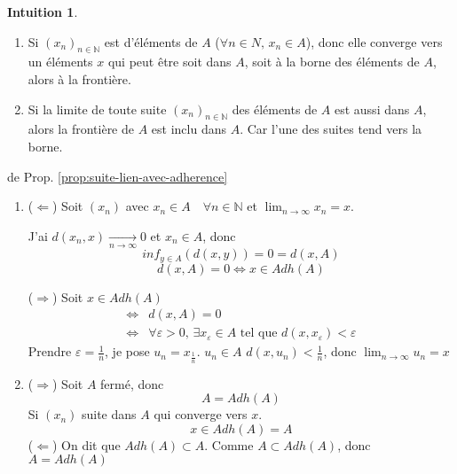 \documentclass[a4paper]{report}
\newcommand\N{\ensuremath{\mathbb{N}}}
\let\implies\Rightarrow
\let\impliedby\Leftarrow
\let\iff\Leftrightarrow
\let\epsilon\varepsilon
\theoremstyle{definition}
\newtheorem*{intuition}{Intuition}
\begin{document}
\begin{intuition}
   \begin{enumerate}
       \item Si $(x_n)_{n \in \N}$ est d'éléments de  $A$ ($\forall n \in N, \, x_n \in A$), donc elle converge vers un éléments $x$ qui peut être soit dans  $A$, soit à la borne des éléments de  $A$, alors à la frontière. 
       \item Si la limite de toute suite $(x_n)_{n \in \N}$ des éléments de  $A$ est aussi dans  $A$, alors la frontière de  $A$ est inclu dans  $A$. Car l'une des suites tend vers la borne.
   \end{enumerate} 
\end{intuition}
\begin{preuve} de Prop. \ref{prop:suite-lien-avec-adherence}
    \begin{enumerate}
        \item ($\impliedby$) Soit $(x_n)$ avec  $x_n \in A \quad \forall n \in \N$ et $\lim_{n \to \infty} x_n = x$.
            \par
            J'ai $d(x_n, x) \xrightarrow[n \to \infty]{} 0$ et $x_n \in A$, donc
             \[
                 inf_{y \in A}(d(x, y)) = 0 = d(x, A)
            \] 
            \[
            d(x, A) = 0 \iff x \in Adh(A)
            \] 
            \par
            ($\implies$) Soit $x \in Adh(A)$
             \begin{align*}
                 \iff& d(x, A) = 0\\
                \iff& \forall \epsilon > 0, \, \exists x_{\epsilon} \in A \text{ tel que } d(x, x_{\epsilon}) < \epsilon
            \end{align*}
            Prendre $\epsilon = \frac{1}{n}$, je pose $u_n = x_{\frac{1}{n}}$. $u_n \in A$  $d(x, u_n) < \frac{1}{n}$, donc $\lim_{n \to \infty} u_n = x$ 
        \item ($\implies$) Soit $A$ fermé, donc 
             \[
            A = Adh(A)
            \] 
            Si $(x_n)$ suite dans  $A$ qui converge vers  $x$.
             \[
            x \in Adh(A) = A
            \] 
            ($\impliedby$) On dit que $Adh(A) \subset A$. Comme $A \subset Adh(A)$, donc $A = Adh(A)$
    \end{enumerate} 
 \end{preuve}
\end{document}

